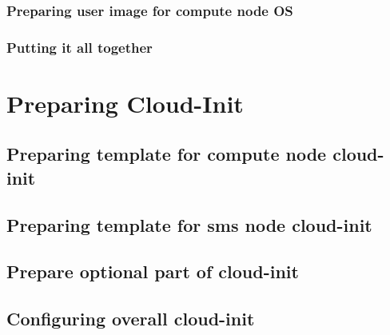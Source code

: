 \documentclass[letterpaper]{article}
\begin{document}
\subsubsection{Preparing user image for compute node OS}\label{sec:compute_node_images}


\newpage
\subsubsection{Putting it all together }\label{sec:compute_node_images_all_together}



\clearpage

\section{Preparing Cloud-Init} \label{sec:cloud-init_prep}



\subsection{Preparing template for compute node cloud-init} \label{sec:c_i-template_compute_node}



\newpage
\subsection{Preparing template for sms node cloud-init} \label{sec:c_i-template-sms-node}

	

\subsection{Prepare optional part of cloud-init} \label{sec:c_i-optional}



\newpage
\subsection{Configuring overall cloud-init} \label{sec:c_i-config}
\end{document}
